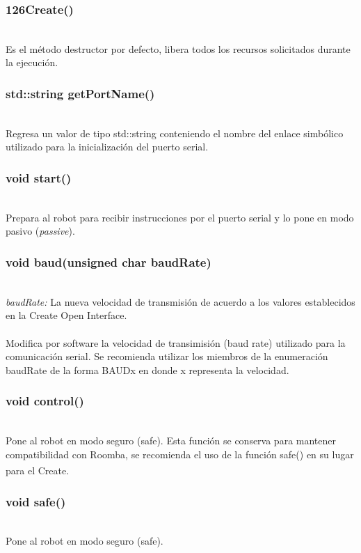 \documentclass[letterpaper]{book}
\begin{document}
\subsubsection{\char126Create()}\mbox{}\\
Es el método destructor por defecto, libera todos los recursos solicitados durante la ejecución.\\

\subsubsection{std::string getPortName()}\mbox{}\\
Regresa un valor de tipo std::string conteniendo el nombre del enlace simbólico utilizado para la inicialización del puerto serial.

\subsubsection{void start()}\mbox{}\\
Prepara al robot para recibir instrucciones por el puerto serial y lo pone en modo pasivo (\emph{passive}).\\

\subsubsection{void baud(unsigned char baudRate)}\mbox{}\\
\emph{baudRate: } La nueva velocidad de transmisión de acuerdo a los valores establecidos en la Create Open Interface.\\\\
Modifica por software la velocidad de transimisión (baud rate) utilizado para la comunicación serial.  Se recomienda utilizar los miembros de la enumeración baudRate de la forma BAUDx en donde x representa la velocidad.\\

\subsubsection{void control()}\mbox{}\\
Pone al robot en modo seguro (safe). Esta función se conserva para mantener compatibilidad con Roomba, se recomienda el uso de la función safe() en su lugar para el Create\textsuperscript{\textregistered}.\\
		
\subsubsection{void safe()}\mbox{}\\
Pone al robot en modo seguro (safe).\\
\end{document}

